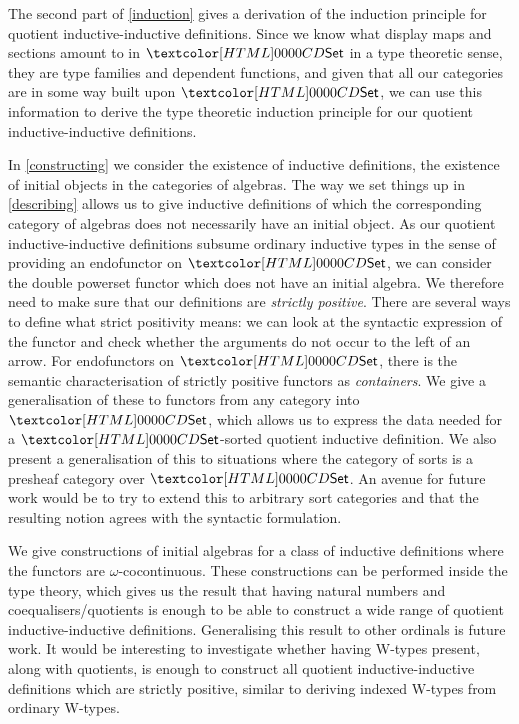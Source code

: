 The second part of \cref{induction} gives a derivation of the
induction principle for quotient inductive-inductive
definitions. Since we know what display maps and sections amount to in
$\Set$ in a type theoretic sense, \ie they are type families and
dependent functions, and given that all our categories are in some way
built upon $\Set$, we can use this information to derive the type
theoretic induction principle for our quotient inductive-inductive
definitions.

In \cref{constructing} we consider the existence of inductive
definitions, \ie the existence of initial objects in the categories of
algebras. The way we set things up in \cref{describing} allows us to
give inductive definitions of which the corresponding category of
algebras does not necessarily have an initial object. As our quotient
inductive-inductive definitions subsume ordinary inductive types in
the sense of providing an endofunctor on $\Set$, we can consider the
double powerset functor which does not have an initial algebra. We
therefore need to make sure that our definitions are \emph{strictly
  positive}. There are several ways to define what strict positivity
means: we can look at the syntactic expression of the functor and
check whether the arguments do not occur to the left of an arrow. For
endofunctors on $\Set$, there is the semantic characterisation of
strictly positive functors as \emph{containers}. We give a
generalisation of these to functors from any category into $\Set$,
which allows us to express the data needed for a $\Set$-sorted
quotient inductive definition. We also present a generalisation of
this to situations where the category of sorts is a presheaf category
over $\Set$. An avenue for future work would be to try to extend this
to arbitrary sort categories and that the resulting notion agrees with
the syntactic formulation.

We give constructions of initial algebras for a class of inductive
definitions where the functors are $\omega$-cocontinuous. These
constructions can be performed inside the type theory, which gives us
the result that having natural numbers and coequalisers/quotients is
enough to be able to construct a wide range of quotient
inductive-inductive definitions. Generalising this result to other
ordinals is future work. It would be interesting to investigate
whether having W-types present, along with quotients, is enough to
construct all quotient inductive-inductive definitions which are
strictly positive, similar to deriving indexed W-types from ordinary
W-types.

